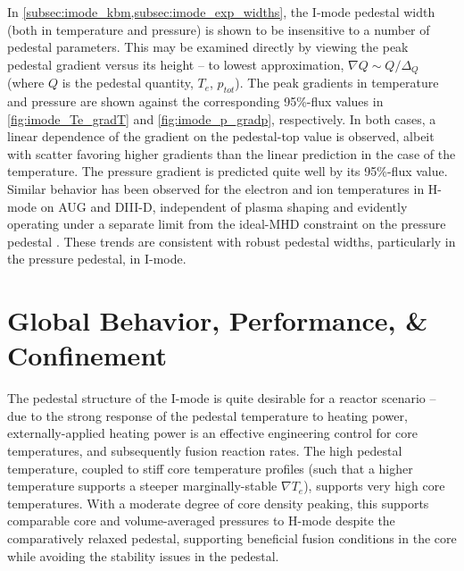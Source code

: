 In \cref{subsec:imode_kbm,subsec:imode_exp_widths}, the I-mode pedestal width (both in temperature and pressure) is shown to be insensitive to a number of pedestal parameters.  This may be examined directly by viewing the peak pedestal gradient versus its height -- to lowest approximation, $\nabla Q \sim Q/\Delta_Q$ (where $Q$ is the pedestal quantity, \ie $T_e$, $p_{tot}$).  The peak gradients in temperature and pressure are shown against the corresponding 95\%-flux values in \cref{fig:imode_Te_gradT} and \cref{fig:imode_p_gradp}, respectively.  In both cases, a linear dependence of the gradient on the pedestal-top value is observed, albeit with scatter favoring higher gradients than the linear prediction in the case of the temperature.  The pressure gradient is predicted quite well by its 95\%-flux value.  Similar behavior has been observed for the electron and ion temperatures in H-mode on AUG and DIII-D, independent of plasma shaping and evidently operating under a separate limit from the ideal-MHD constraint on the pressure pedestal \cite{Schneider2013}.  These trends are consistent with robust pedestal widths, particularly in the pressure pedestal, in I-mode.  


\nicesectionending

\section{Global Behavior, Performance, \& Confinement}\label{sec:imode_confinement}

The pedestal structure of the I-mode is quite desirable for a reactor scenario -- due to the strong response of the pedestal temperature to heating power, externally-applied heating power is an effective engineering control for core temperatures, and subsequently fusion reaction rates.  The high pedestal temperature, coupled to stiff core temperature profiles (such that a higher temperature supports a steeper marginally-stable $\nabla T_e$), supports very high core temperatures.  With a moderate degree of core density peaking, this supports comparable core and volume-averaged pressures to H-mode despite the comparatively relaxed pedestal, supporting beneficial fusion conditions in the core while avoiding the stability issues in the pedestal.


